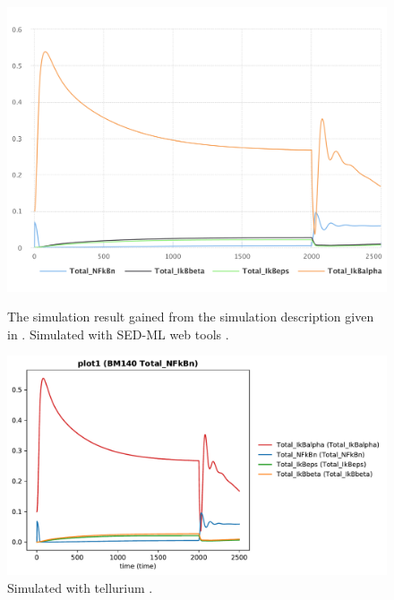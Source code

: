 \begin{figure}[ht]
    \centering
    \begin{minipage}{0.47\textwidth}
        \centering
        \includegraphics[width=1.0\textwidth]{examples/ikappab/results/sedml_webtools/plot1}
        \caption{The simulation result gained from the simulation description given in . Simulated with SED-ML web tools \citep{bergmann2017sed}.}
    \end{minipage}\hfill
    \begin{minipage}{0.47\textwidth}
        \centering
        \includegraphics[width=1.0\textwidth]{examples/ikappab/results/tellurium/plot1}
        \caption{Simulated with tellurium \citep{tellurium}.}
    \end{minipage}
    \label{fig:ikappab}
\end{figure}

